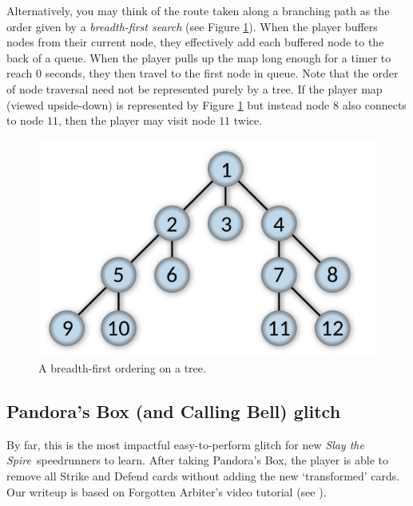 \documentclass[12pt]{amsart}
\newcommand{\sts}{\textit{Slay the Spire}}
\begin{document}
Alternatively, you may think of the route taken along a branching path as the order given by a \textit{breadth-first search} (see Figure \ref{fig: BFS tree}).  
When the player buffers nodes from their current node, they effectively add each buffered node to the back of a queue.  
When the player pulls up the map long enough for a timer to reach $0$ seconds, they then travel to the first node in queue.  
Note that the order of node traversal need not be represented purely by a tree.  
If the player map (viewed upside-down) is represented by Figure \ref{fig: BFS tree} but instead node $8$ also connects to node $11$, then the player may visit node $11$ twice.  
\begin{figure}[h]
    \centering
    \includegraphics[scale=.1]{graphics/BFSTree.png}
    \caption{A breadth-first ordering on a tree.  }
    \label{fig: BFS tree}
\end{figure}
\subsection{Pandora's Box (and Calling Bell) glitch}\label{sub-sec: pandora's box glitch}
By far, this is the most impactful easy-to-perform glitch for new \sts~speedrunners to learn.  
After taking Pandora's Box, the player is able to remove all Strike and Defend cards without adding the new `transformed' cards.  
Our writeup is based on Forgotten Arbiter's video tutorial (see \cite{ForgottenArbiterMoreGlitches}).  
\\
\end{document}
